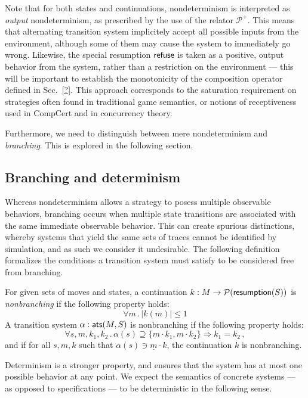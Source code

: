 Note that for both states and continuations,
nondeterminism is interpreted as \emph{output} nondeterminism,
as prescribed by the use of the relator $\mathcal{P}^+$.
This means that alternating transition system
implicitely accept all possible inputs from the environment,
although some of them may cause the system to immediately go wrong.
Likewise,
the special resumption $ \mathsf{refuse} $
is taken as a positive, output behavior from the system,
rather than a restriction on the environment ---
this will be important to establish the monotonicity
of the composition operator defined in Sec.~\ref{?}.
This approach corresponds to the saturation requirement on strategies
often found in traditional game semantics,
or notions of receptiveness used in CompCert
and in concurrency theory.

Furthermore, we need to distinguish between mere nondeterminism
and \emph{branching}.
This is explored in the following section.

\subsection{Branching and determinism}

Whereas nondeterminism allows a strategy to posess
multiple observable behaviors,
branching occurs when multiple state transitions
are associated with the same immediate observable behavior.
This can create spurious distinctions,
whereby systems that yield the same sets of traces
cannot be identified by simulation,
and as such we consider it undesirable.
The following definition
formalizes the conditions a transition system must satisfy
to be considered free from branching.

\begin{definition}
For given sets of moves and states,
a continuation $k : M \rightarrow \mathcal{P}( \mathsf{resumption} (S))$
is \emph{nonbranching} if the following property holds:
\[ \forall m \,.\, | k(m) | \le 1 \]
A transition system $\alpha :  \mathsf{ats} (M, S)$ is nonbranching
if the following property holds:
\[ \forall s, m, k_1, k_2 \,.\,
     \alpha(s) \supseteq \{ m \cdot k_1, m \cdot k_2 \} \Rightarrow
     k_1 = k_2 \,, \]
and if for all $s, m, k$ such that $\alpha(s) \ni \underline{m} \cdot k$,
the continuation $k$ is nonbranching.
\end{definition}

Determinism is a stronger property,
and ensures that the system has at most one possible behavior
at any point.
We expect the semantics of concrete systems ---
as opposed to specifications ---
to be deterministic in the following sense.

